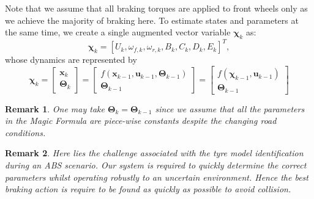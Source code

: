 \documentclass[onecolumn,journal,draftclsnofoot]{IEEEtran}
\newtheorem{remark}{Remark}
\begin{document}

Note that we assume that all braking torques are applied to front wheels only as we achieve the majority of braking here. 
To estimate states and parameters at the same time, we create a single augmented vector variable $ \mathbf{\chi}_k$ as:
\begin{equation*}
    \mathbf{\chi}_k = \left[ U_k, \omega_{f,k},\omega_{r,k}, B_k, C_k, D_k, E_k \right]^T,
\end{equation*}
whose dynamics are represented by
\begin{equation}\label{eqn:abssystdyn}
\mathbf{\chi}_k = 
    \begin{bmatrix}
        \mathbf{x}_{k}\\
        \mathbf{\Theta}_{k}
    \end{bmatrix}
    =
    \begin{bmatrix}
        f\left(\mathbf{x}_{k-1},\mathbf{u}_{k-1},\mathbf{\Theta}_{k-1} \right)\\
        \mathbf{\Theta}_{k-1}
    \end{bmatrix}
    =
    \begin{bmatrix} f\left(\mathbf{\chi}_{k-1},\mathbf{u}_{k-1}\right)\\       \mathbf{\Theta}_{k-1}
    \end{bmatrix}
\end{equation}



\begin{remark}
One may take $\mathbf{\Theta}_k=\mathbf{\Theta}_{k-1}$ since we assume that all the parameters in the Magic Formula are piece-wise constants despite the changing road conditions. %
\end{remark}
\begin{remark}
Here lies the challenge associated with the tyre model identification during an ABS scenario. Our system is required to quickly determine the correct parameters whilst operating robustly to an uncertain environment. Hence the best braking action is require to be found as quickly as possible to avoid collision. %
\end{remark}
\end{document}
